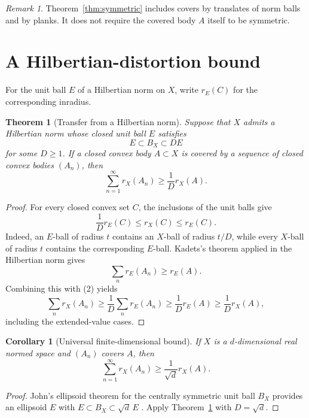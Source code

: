 \documentclass[11pt]{article}
\newtheorem{theorem}{Theorem}
\newtheorem{corollary}{Corollary}
\theoremstyle{remark}
\newtheorem{remark}{Remark}
\newcommand{\Ball}{B_X}
\newcommand{\rin}{r_X}
\begin{document}
\begin{remark}
Theorem~\ref{thm:symmetric} includes covers by translates of norm balls and
by planks. It does not require the covered body \(A\) itself to be symmetric.
\end{remark}

\section{A Hilbertian-distortion bound}

For the unit ball \(E\) of a Hilbertian norm on \(X\), write \(r_E(C)\) for
the corresponding inradius.

\begin{theorem}[Transfer from a Hilbertian norm]
\label{thm:distortion}
Suppose that \(X\) admits a Hilbertian norm whose closed unit ball \(E\)
satisfies
\[
  E\subset \Ball\subset D E
\]
for some \(D\ge1\). If a closed convex body \(A\subset X\) is covered by a
sequence of closed convex bodies \((A_n)\), then
\[
  \sum_{n=1}^{\infty}\rin(A_n)\ge \frac1D\rin(A).
\]
\end{theorem}

\begin{proof}
For every closed convex set \(C\), the inclusions of the unit balls give
\[
  \frac1D r_E(C)\le \rin(C)\le r_E(C).                 \tag{2}
\]
Indeed, an \(E\)-ball of radius \(t\) contains an \(X\)-ball of radius
\(t/D\), while every \(X\)-ball of radius \(t\) contains the corresponding
\(E\)-ball. Kadets's theorem applied in the Hilbertian norm gives
\[
  \sum_n r_E(A_n)\ge r_E(A).
\]
Combining this with (2) yields
\[
  \sum_n\rin(A_n)
  \ge \frac1D\sum_n r_E(A_n)
  \ge \frac1D r_E(A)
  \ge \frac1D\rin(A),
\]
including the extended-value cases.
\end{proof}

\begin{corollary}[Universal finite-dimensional bound]
\label{cor:john}
If \(X\) is a \(d\)-dimensional real normed space and \((A_n)\) covers
\(A\), then
\[
  \sum_{n=1}^{\infty}\rin(A_n)\ge\frac1{\sqrt d}\rin(A).
\]
\end{corollary}

\begin{proof}
John's ellipsoid theorem for the centrally symmetric unit ball \(\Ball\)
provides an ellipsoid \(E\) with
\(E\subset\Ball\subset\sqrt d\,E\) \cite{John}. Apply
Theorem~\ref{thm:distortion} with \(D=\sqrt d\).
\end{proof}
\end{document}
